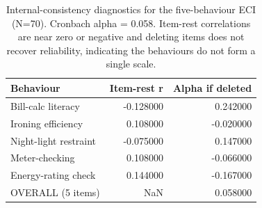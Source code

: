 \begin{table}
\caption{Internal-consistency diagnostics for the five-behaviour ECI (N=70). Cronbach alpha = 0.058. Item-rest correlations are near zero or negative and deleting items does not recover reliability, indicating the behaviours do not form a single scale.}
\label{tab:05_reliability}
\begin{tabular}{lrr}
\toprule
Behaviour & Item-rest r & Alpha if deleted \\
\midrule
Bill-calc literacy & -0.128000 & 0.242000 \\
Ironing efficiency & 0.108000 & -0.020000 \\
Night-light restraint & -0.075000 & 0.147000 \\
Meter-checking & 0.108000 & -0.066000 \\
Energy-rating check & 0.144000 & -0.167000 \\
OVERALL (5 items) & NaN & 0.058000 \\
\bottomrule
\end{tabular}
\end{table}
